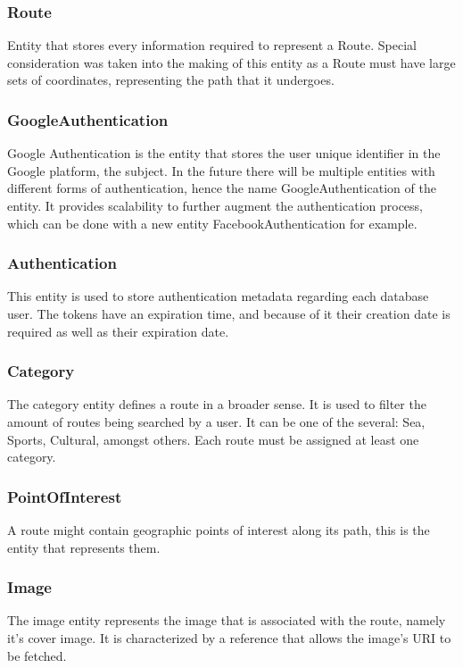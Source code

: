         \subsubsection*{Route}
        Entity that stores every information required to represent a Route. Special consideration was taken into the making
        of this entity as a Route must have large sets of coordinates, representing the path that it undergoes. 

        \subsubsection*{GoogleAuthentication}
        Google Authentication is the entity that stores the user unique identifier in the Google platform, the subject.
        In the future there will be multiple entities with different forms of authentication, hence the name GoogleAuthentication 
        of the entity. It provides scalability to further augment the authentication process, which can be done
        with a new entity FacebookAuthentication for example.

        \subsubsection*{Authentication}
        This entity is used to store authentication metadata regarding each database user. The tokens have an expiration time,
        and because of it their creation date is required as well as their expiration date.

        \subsubsection*{Category}
        The category entity defines a route in a broader sense. It is used to filter the amount of routes being 
        searched by a user. It can be one of the several: Sea, Sports, Cultural, amongst others.
        Each route must be assigned at least one category.

        \subsubsection*{PointOfInterest}
        A route might contain geographic points of interest along its path, this is the entity that represents them. 

        \subsubsection*{Image}
        The image entity represents the image that is associated with the route, namely it's cover image. It is characterized by a reference
        that allows the image's URI to be fetched.

